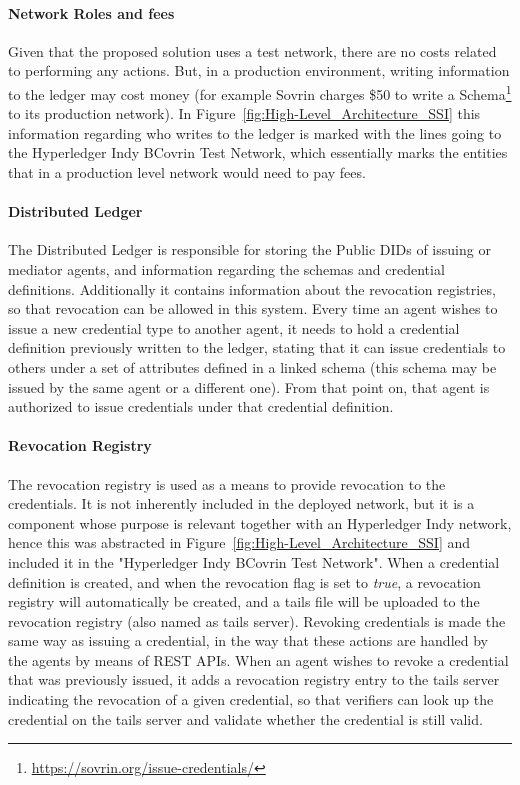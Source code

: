 \paragraph{Network Roles and fees}

Given that the proposed solution uses a test network, there are no costs related to performing any actions. But, in a production environment, writing information to the ledger may cost money (for example Sovrin charges \$50 to write a Schema\footnote{\url{https://sovrin.org/issue-credentials/}} to its production network). In Figure~\ref{fig:High-Level_Architecture_SSI} this information regarding who writes to the ledger is marked with the lines going to the Hyperledger Indy BCovrin Test Network, which essentially marks the entities that in a production level network would need to pay fees.

\paragraph{Distributed Ledger}

The Distributed Ledger is responsible for storing the Public DIDs of issuing or mediator agents, and information regarding the schemas and credential definitions. Additionally it contains information about the revocation registries, so that revocation can be allowed in this system.
Every time an agent wishes to issue a new credential type to another agent, it needs to hold a credential definition previously written to the ledger, stating that it can issue credentials to others under a set of attributes defined in a linked schema (this schema may be issued by the same agent or a different one). From that point on, that agent is authorized to issue credentials under that credential definition.

\paragraph{Revocation Registry}

The revocation registry is used as a means to provide revocation to the credentials. It is not inherently included in the deployed network, but it is a component whose purpose is relevant together with an Hyperledger Indy network, hence this was abstracted in Figure~\ref{fig:High-Level_Architecture_SSI} and included it in the "Hyperledger Indy BCovrin Test Network". When a credential definition is created, and when the revocation flag is set to \textit{true}, a revocation registry will automatically be created, and a tails file will be uploaded to the revocation registry (also named as tails server). Revoking credentials is made the same way as issuing a credential, in the way that these actions are handled by the agents by means of REST APIs. When an agent wishes to revoke a credential that was previously issued, it adds a revocation registry entry to the tails server indicating the revocation of a given credential, so that verifiers can look up the credential on the tails server and validate whether the credential is still valid.


